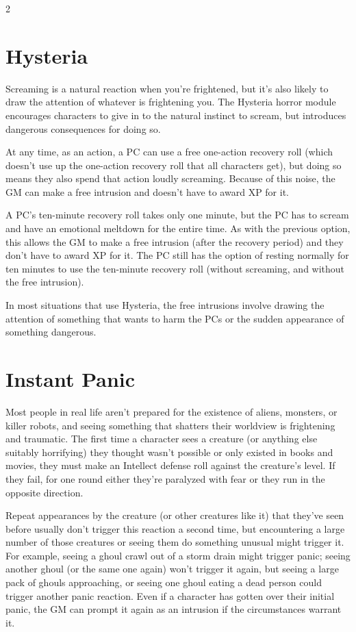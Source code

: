 \begin{multicols}{2}

\section{Hysteria}

Screaming is a natural reaction when you’re frightened, but it’s also likely to draw the attention of whatever is frightening you. The Hysteria horror module encourages characters to give in to the natural instinct to scream, but introduces dangerous consequences for doing so.

At any time, as an action, a PC can use a free one-action recovery roll (which doesn’t use up the one-action recovery roll that all characters get), but doing so means they also spend that action loudly screaming. Because of this noise, the GM can make a free intrusion and doesn’t have to award XP for it.

A PC’s ten-minute recovery roll takes only one minute, but the PC
has to scream and have an emotional meltdown for the entire time. As with the previous option, this allows the GM to make a free intrusion (after the recovery period) and they don’t have to award XP for it. The PC still has the option of resting normally for ten minutes to use the ten-minute recovery roll (without screaming, and without the free intrusion).

In most situations that use Hysteria, the free intrusions involve drawing the
attention of something that wants to harm the PCs or the sudden appearance of something dangerous.

\section{Instant Panic}

Most people in real life aren’t prepared for the existence of aliens, monsters, or killer robots, and seeing something that shatters their worldview is frightening and traumatic. The first time a character sees a creature (or anything else suitably horrifying) they thought wasn’t possible or only existed in books and movies, they must make an Intellect defense roll against the creature’s level. If they fail, for one round either they’re paralyzed with fear or they run in the opposite direction.

Repeat appearances by the creature (or other creatures like it) that they’ve seen before usually don’t trigger this reaction a second time, but encountering a large number of those creatures or seeing them do something unusual might trigger it. For example, seeing a ghoul crawl out of a storm drain might trigger panic; seeing another ghoul (or the same one again) won’t trigger it again, but seeing a large pack of ghouls approaching, or seeing one ghoul eating a dead person could trigger another panic reaction. Even if a character has gotten over their initial panic, the GM can prompt it again as an intrusion if the circumstances warrant it.


\end{multicols}
